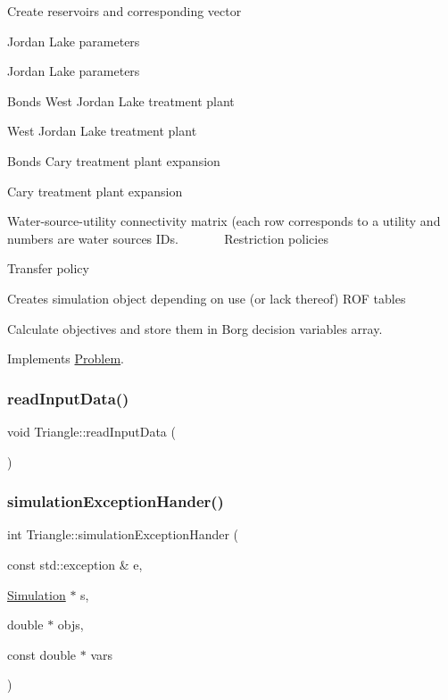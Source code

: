 Create reservoirs and corresponding vector

Jordan Lake parameters

Jordan Lake parameters

Bonds West Jordan Lake treatment plant

West Jordan Lake treatment plant

Bonds Cary treatment plant expansion

Cary treatment plant expansion

Water-\/source-\/utility connectivity matrix (each row corresponds to a utility and numbers are water sources I\+Ds. ~\newline
~\newline
~\newline
~\newline
 Restriction policies

Transfer policy

Creates simulation object depending on use (or lack thereof) R\+OF tables

Calculate objectives and store them in Borg decision variables array. 

Implements \mbox{\hyperlink{classProblem_acd924a80df4422c5199748c714e9405c_acd924a80df4422c5199748c714e9405c}{Problem}}.

\mbox{\label{classTriangle_a045e3263a62a8a628fe5645f0323b7e4_a045e3263a62a8a628fe5645f0323b7e4}} 
\subsubsection{\texorpdfstring{read\+Input\+Data()}{readInputData()}}
{\footnotesize\ttfamily void Triangle\+::read\+Input\+Data (\begin{DoxyParamCaption}{ }\end{DoxyParamCaption})}

\mbox{\label{classTriangle_a816ff476231f6bd575c82978706f4b9a_a816ff476231f6bd575c82978706f4b9a}} 
\subsubsection{\texorpdfstring{simulation\+Exception\+Hander()}{simulationExceptionHander()}}
{\footnotesize\ttfamily int Triangle\+::simulation\+Exception\+Hander (\begin{DoxyParamCaption}\item[{const std\+::exception \&}]{e,  }\item[{\mbox{\hyperlink{classSimulation}{Simulation}} $\ast$}]{s,  }\item[{double $\ast$}]{objs,  }\item[{const double $\ast$}]{vars }\end{DoxyParamCaption})}



